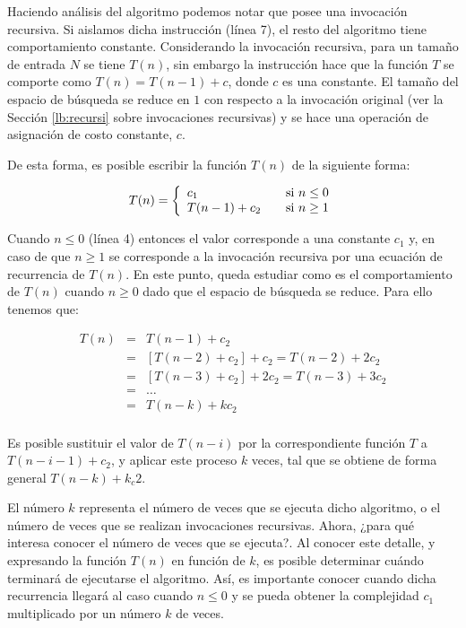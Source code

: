 Haciendo análisis del algoritmo podemos notar que posee una invocación recursiva. Si aislamos dicha instrucción (línea 7), el resto del algoritmo tiene comportamiento constante. Considerando la invocación recursiva, para un tamaño de entrada $N$ se tiene $T(n)$, sin embargo la instrucción hace que la función $T$ se comporte como $T(n) = T(n-1) + c$, donde $c$ es una constante. El tamaño del espacio de búsqueda se reduce en $1$ con respecto a la invocación original (ver la Sección \ref{lb:recursi} sobre invocaciones recursivas) y se hace una operación de asignación de costo constante, $c$.

De esta forma, es posible escribir la función $T(n)$ de la siguiente forma:

\begin{equation}
T(n) = \left\{
  \begin{array}{l l}
    c_1 & \quad \text{si $n \le 0$}\\
    T(n-1) + c_2& \quad \text{si $n \ge 1$}
  \end{array} \right.
 \end{equation}
 
 Cuando $n \le 0$ (línea 4) entonces el valor corresponde a una constante $c_1$ y, en caso de que $n \ge 1$ se corresponde a la invocación recursiva por una ecuación de recurrencia de $T(n)$. En este punto, queda estudiar como es el comportamiento de $T(n)$ cuando $n \ge 0$ dado que el espacio de búsqueda se reduce. Para ello tenemos que:

\begin{eqnarray*}
T(n)&=&T(n-1) + c_2\\
&=&\left [ T(n-2) + c_2\right ] + c_2 = T(n-2) + 2c_2\\
&=&\left [ T(n-3) + c_2\right ] + 2c_2 = T(n-3) + 3c_2\\
&=&\dots\\
&=&T(n-k) + kc_2\\
\end{eqnarray*}

Es posible sustituir el valor de $T(n - i)$ por la correspondiente función $T$ a $T(n - i - 1) + c_2$, y aplicar este proceso $k$ veces, tal que se obtiene de forma general $T(n - k) + k_c2$.

El número $k$ representa el número de veces que se ejecuta dicho algoritmo, o el número de veces que se realizan invocaciones recursivas. Ahora, ¿para qué interesa conocer el número de veces que se ejecuta?. Al conocer este detalle, y expresando la función $T(n)$ en función de $k$, es posible determinar cuándo terminará de ejecutarse el algoritmo. Así, es importante conocer cuando dicha recurrencia llegará al caso cuando $n \le 0$ y se pueda obtener la complejidad $c_1$ multiplicado por un número $k$ de veces.

